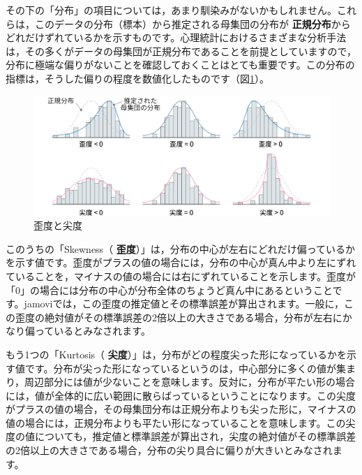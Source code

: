 \documentclass[
  12pt,
  a5jpaper,
  lualatex, ja=standard]{bxjsbook}
\renewcommand{\emph}[1]{\textbf{\color{emph} #1}}
\begin{document}
その下の「分布」の項目については，あまり馴染みがないかもしれません。これらは，このデータの分布（標本）から推定される母集団の分布が\emph{正規分布}からどれだけずれているかを示すものです。心理統計におけるさまざまな分析手法は，その多くがデータの母集団が正規分布であることを前提としていますので，分布に極端な偏りがないことを確認しておくことはとても重要です。この分布の指標は，そうした偏りの程度を数値化したものです（図\ref{fig:exp-distribution}）。

\begin{figure}[!ht]

{\centering \includegraphics[width=1\linewidth]{images/exploration/distribution} 

}

\caption{歪度と尖度}\label{fig:exp-distribution}
\end{figure}

このうちの「Skewness（\emph{歪度}）」は，分布の中心が左右にどれだけ偏っているかを示す値です。歪度がプラスの値の場合には，分布の中心が真ん中より左にずれていることを，マイナスの値の場合には右にずれていることを示します。歪度が「0」の場合には分布の中心が分布全体のちょうど真ん中にあるということです。jamoviでは，この歪度の推定値とその標準誤差が算出されます。一般に，この歪度の絶対値がその標準誤差の2倍以上の大きさである場合，分布が左右にかなり偏っているとみなされます。

もう1つの「Kurtosis（\emph{尖度}）」は，分布がどの程度尖った形になっているかを示す値です。分布が尖った形になっているというのは，中心部分に多くの値が集まり，周辺部分には値が少ないことを意味します。反対に，分布が平たい形の場合には，値が全体的に広い範囲に散らばっているということになります。この尖度がプラスの値の場合，その母集団分布は正規分布よりも尖った形に，マイナスの値の場合には，正規分布よりも平たい形になっていることを意味します。この尖度の値についても，推定値と標準誤差が算出され，尖度の絶対値がその標準誤差の2倍以上の大きさである場合，分布の尖り具合に偏りが大きいとみなされます。
\end{document}
